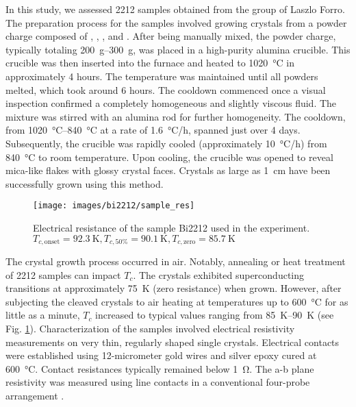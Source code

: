 In this study, we assessed 2212 samples obtained from the group of Laszlo Forro.
The preparation process for the samples involved growing crystals from a powder charge composed of , , , and .
After being manually mixed, the powder charge, typically totaling \qtyrange{200}{300}{\gram}, was placed in a high-purity alumina crucible.
This crucible was then inserted into the furnace and heated to \qty{1020}{\degreeCelsius} in approximately 4 hours.
The temperature was maintained until all powders melted, which took around 6 hours.
The cooldown commenced once a visual inspection confirmed a completely homogeneous and slightly viscous fluid.
The mixture was stirred with an alumina rod for further homogeneity.
The cooldown, from \qtyrange{1020}{840}{\degreeCelsius} at a rate of \qty{1.6}{\degreeCelsius/\hour}, spanned just over 4 days.
Subsequently, the crucible was rapidly cooled (approximately \qty{10}{\degreeCelsius/\hour}) from \qty{840}{\degreeCelsius} to room temperature.
Upon cooling, the crucible was opened to reveal mica-like flakes with glossy crystal faces. Crystals as large as \qty{1}{\centi\meter} have been successfully grown using this method.

\begin{figure}
	\centering
	\texttt{[image: images/bi2212/sample\_res]}
	\caption{Electrical resistance of the sample Bi2212 used in the experiment. $T_{c,\text{onset}}=\qty{92.3}{\kelvin}, T_{c,\text{50\%}}=\qty{90.1}{\kelvin}, T_{c,\text{zero}}=\qty{85.7}{\kelvin}$}
	\label{fig:sample_res}
\end{figure}


The crystal growth process occurred in air.
Notably, annealing or heat treatment of 2212 samples can impact $T_c$.
The crystals exhibited superconducting transitions at approximately \qty{75}{\kelvin} (zero resistance) when grown.
However, after subjecting the cleaved crystals to air heating at temperatures up to \qty{600}{\degreeCelsius} for as little as a minute, $T_c$ increased to typical values ranging from \qtyrange{85}{90}{\kelvin} (see Fig. \ref{fig:sample_res}).
Characterization of the samples involved electrical resistivity measurements on very thin, regularly shaped single crystals. Electrical contacts were established using 12-micrometer gold wires and silver epoxy cured at \qty{600}{\degreeCelsius}.
Contact resistances typically remained below \qty{1}{\ohm}.
The a-b plane resistivity was measured using line contacts in a conventional four-probe arrangement \cite{kendziora_composition_1992}.

